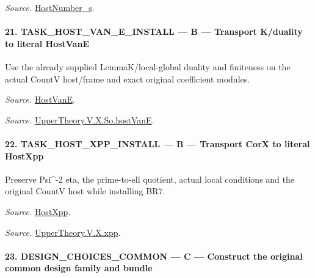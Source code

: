 \documentclass[11pt,a4paper]{article}
\numberwithin{equation}{section}
\theoremstyle{remark}\newtheorem{remark}[theorem]{Remark}
\begin{document}
\emph{Source.} \href{https://github.com/CocoSgt/riemann-hypothesis-lean/blob/7cbf7a0c32fca1badf05931879a37c3f8a2b03b4/src/Development/AutomorphicArithmetic/AutomorphicVarieties/ModularityArgument/ThresholdArguments/DenseThresholdCases/HostNumberS.lean#L18-L28}{HostNumber\_\allowbreak s}.



\paragraph{21. TASK\_\allowbreak HOST\_\allowbreak VAN\_\allowbreak E\_\allowbreak INSTALL — B — Transport K/duality to literal HostVanE}

Use the already supplied LemmaK/local-global duality and finiteness on the actual CountV host/frame and exact original coefficient modules.

\emph{Source.} \href{https://github.com/CocoSgt/riemann-hypothesis-lean/blob/7cbf7a0c32fca1badf05931879a37c3f8a2b03b4/src/Development/AutomorphicArithmetic/AutomorphicVarieties/UnitaryThreeDeformations/HostNumber.lean#L9-L12}{HostVanE}.

\emph{Source.} \href{https://github.com/CocoSgt/riemann-hypothesis-lean/blob/7cbf7a0c32fca1badf05931879a37c3f8a2b03b4/src/Development/AutomorphicArithmetic/AutomorphicVarieties/LevelCohomology/SoHostVanE.lean#L11-L18}{UpperTheory.V.X.So.hostVanE}.



\paragraph{22. TASK\_\allowbreak HOST\_\allowbreak XPP\_\allowbreak INSTALL — B — Transport CorX to literal HostXpp}

Preserve Psi\textasciicircum{}-2 eta, the prime-to-ell quotient, actual local conditions and the original CountV host while installing BR7.

\emph{Source.} \href{https://github.com/CocoSgt/riemann-hypothesis-lean/blob/7cbf7a0c32fca1badf05931879a37c3f8a2b03b4/src/Development/AutomorphicArithmetic/AutomorphicVarieties/UnitaryThreeDeformations/HostNumber.lean#L14-L17}{HostXpp}.

\emph{Source.} \href{https://github.com/CocoSgt/riemann-hypothesis-lean/blob/7cbf7a0c32fca1badf05931879a37c3f8a2b03b4/src/Development/AutomorphicArithmetic/AutomorphicVarieties/LevelCohomology/Xpp.lean#L11-L84}{UpperTheory.V.X.xpp}.



\paragraph{23. DESIGN\_\allowbreak CHOICES\_\allowbreak COMMON — C — Construct the original common design family and bundle}
\end{document}
